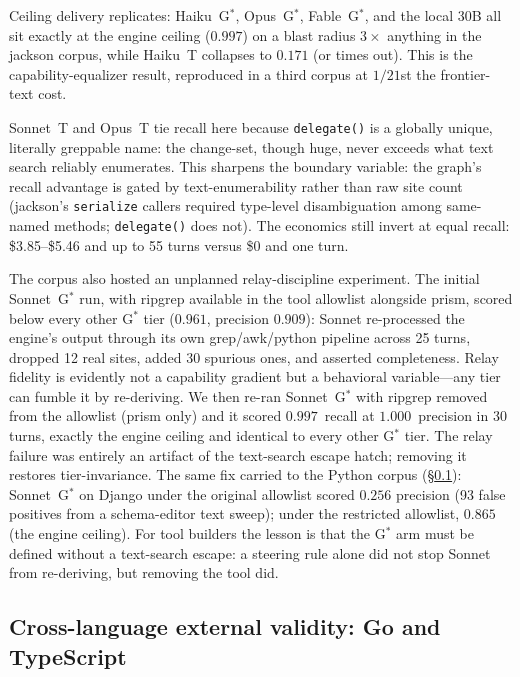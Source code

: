 \documentclass[11pt]{article}
\newcommand{\code}[1]{\texttt{#1}}
\newcommand{\gstar}{G$^{*}$}
\begin{document}
Ceiling delivery replicates: Haiku~\gstar{},
Opus~\gstar{}, Fable~\gstar{}, and the local 30B all sit exactly at the
engine ceiling ($0.997$) on a blast radius $3\times$ anything in the
jackson corpus, while Haiku~T collapses to $0.171$ (or times out). This is
the capability-equalizer result, reproduced in a third corpus at $1/21$st
the frontier-text cost.

Sonnet~T and Opus~T tie recall here because \code{delegate()} is a
globally unique, literally greppable name: the change-set, though huge,
never exceeds what text search reliably enumerates. This sharpens the boundary variable: the graph's recall
advantage is gated by text-enumerability rather than raw site count
(jackson's \code{serialize} callers required type-level disambiguation
among same-named methods; \code{delegate()} does not). The economics still
invert at equal recall: \$3.85--\$5.46 and up to 55 turns versus \$0 and
one turn.

The corpus also hosted an unplanned relay-discipline experiment. The initial
Sonnet~\gstar{} run, with ripgrep available in the tool allowlist alongside
prism, scored below every other \gstar{} tier ($0.961$, precision $0.909$):
Sonnet re-processed the engine's output through its own grep/awk/python
pipeline across 25 turns, dropped 12 real sites, added 30 spurious
ones, and asserted completeness. Relay fidelity is evidently not a
capability gradient but a behavioral variable---any tier can
fumble it by re-deriving. We then re-ran Sonnet~\gstar{} with ripgrep
removed from the allowlist (prism only) and it scored $0.997$~recall at
$1.000$~precision in 30 turns, exactly the engine ceiling and
identical to every other \gstar{} tier. The relay failure was entirely
an artifact of the text-search escape hatch; removing it
restores tier-invariance. The same fix carried to the
Python corpus (\S\ref{sec:crosslang}): Sonnet~\gstar{} on Django under
the original allowlist scored $0.256$ precision (93 false positives from a
schema-editor text sweep); under the restricted allowlist, $0.865$
(the engine ceiling). For tool builders the lesson is that the
\gstar{} arm must be defined without a text-search escape: a steering
rule alone did not stop Sonnet from re-deriving, but removing the tool did.

\subsection{Cross-language external validity: Go and TypeScript}
\label{sec:crosslang}
\end{document}

